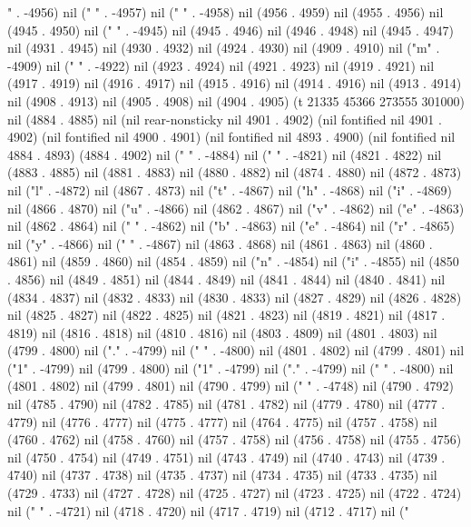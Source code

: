 " . -4956) nil (" " . -4957) nil (" " . -4958) nil (4956 . 4959) nil (4955 . 4956) nil (4945 . 4950) nil (" " . -4945) nil (4945 . 4946) nil (4946 . 4948) nil (4945 . 4947) nil (4931 . 4945) nil (4930 . 4932) nil (4924 . 4930) nil (4909 . 4910) nil ("m" . -4909) nil (" " . -4922) nil (4923 . 4924) nil (4921 . 4923) nil (4919 . 4921) nil (4917 . 4919) nil (4916 . 4917) nil (4915 . 4916) nil (4914 . 4916) nil (4913 . 4914) nil (4908 . 4913) nil (4905 . 4908) nil (4904 . 4905) (t 21335 45366 273555 301000) nil (4884 . 4885) nil (nil rear-nonsticky nil 4901 . 4902) (nil fontified nil 4901 . 4902) (nil fontified nil 4900 . 4901) (nil fontified nil 4893 . 4900) (nil fontified nil 4884 . 4893) (4884 . 4902) nil (" " . -4884) nil (" " . -4821) nil (4821 . 4822) nil (4883 . 4885) nil (4881 . 4883) nil (4880 . 4882) nil (4874 . 4880) nil (4872 . 4873) nil ("l" . -4872) nil (4867 . 4873) nil ("t" . -4867) nil ("h" . -4868) nil ("i" . -4869) nil (4866 . 4870) nil ("u" . -4866) nil (4862 . 4867) nil ("v" . -4862) nil ("e" . -4863) nil (4862 . 4864) nil (" " . -4862) nil ("b" . -4863) nil ("e" . -4864) nil ("r" . -4865) nil ("y" . -4866) nil (" " . -4867) nil (4863 . 4868) nil (4861 . 4863) nil (4860 . 4861) nil (4859 . 4860) nil (4854 . 4859) nil ("n" . -4854) nil ("i" . -4855) nil (4850 . 4856) nil (4849 . 4851) nil (4844 . 4849) nil (4841 . 4844) nil (4840 . 4841) nil (4834 . 4837) nil (4832 . 4833) nil (4830 . 4833) nil (4827 . 4829) nil (4826 . 4828) nil (4825 . 4827) nil (4822 . 4825) nil (4821 . 4823) nil (4819 . 4821) nil (4817 . 4819) nil (4816 . 4818) nil (4810 . 4816) nil (4803 . 4809) nil (4801 . 4803) nil (4799 . 4800) nil ("." . -4799) nil (" " . -4800) nil (4801 . 4802) nil (4799 . 4801) nil ("1" . -4799) nil (4799 . 4800) nil ("1" . -4799) nil ("." . -4799) nil (" " . -4800) nil (4801 . 4802) nil (4799 . 4801) nil (4790 . 4799) nil (" " . -4748) nil (4790 . 4792) nil (4785 . 4790) nil (4782 . 4785) nil (4781 . 4782) nil (4779 . 4780) nil (4777 . 4779) nil (4776 . 4777) nil (4775 . 4777) nil (4764 . 4775) nil (4757 . 4758) nil (4760 . 4762) nil (4758 . 4760) nil (4757 . 4758) nil (4756 . 4758) nil (4755 . 4756) nil (4750 . 4754) nil (4749 . 4751) nil (4743 . 4749) nil (4740 . 4743) nil (4739 . 4740) nil (4737 . 4738) nil (4735 . 4737) nil (4734 . 4735) nil (4733 . 4735) nil (4729 . 4733) nil (4727 . 4728) nil (4725 . 4727) nil (4723 . 4725) nil (4722 . 4724) nil (" " . -4721) nil (4718 . 4720) nil (4717 . 4719) nil (4712 . 4717) nil ("
